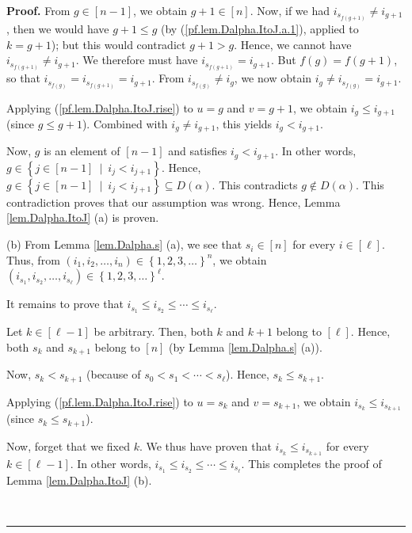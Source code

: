 \documentclass[numbers=enddot,12pt,final,onecolumn,notitlepage,abstracton]{scrartcl}
\theoremstyle{definition}
\newenvironment{proof}[1][Proof]{\noindent\textbf{#1.} }{\ \rule{0.5em}{0.5em}}
\newenvironment{verlong}{}{}
\begin{document}
\begin{verlong}
\begin{footnotesize}
\begin{proof}
From $g\in\left[  n-1\right]  $, we obtain $g+1\in\left[  n\right]  $. Now, if
we had $i_{s_{f\left(  g+1\right)  }}\neq i_{g+1}$, then we would have
$g+1\leq g$ (by (\ref{pf.lem.Dalpha.ItoJ.a.1}), applied to $k=g+1$); but this
would contradict $g+1>g$. Hence, we cannot have $i_{s_{f\left(  g+1\right)  }%
}\neq i_{g+1}$. We therefore must have $i_{s_{f\left(  g+1\right)  }}=i_{g+1}%
$. But $f\left(  g\right)  =f\left(  g+1\right)  $, so that $i_{s_{f\left(
g\right)  }}=i_{s_{f\left(  g+1\right)  }}=i_{g+1}$. From $i_{s_{f\left(
g\right)  }}\neq i_{g}$, we now obtain $i_{g}\neq i_{s_{f\left(  g\right)  }%
}=i_{g+1}$.

Applying (\ref{pf.lem.Dalpha.ItoJ.rise}) to $u=g$ and $v=g+1$, we obtain
$i_{g}\leq i_{g+1}$ (since $g\leq g+1$). Combined with $i_{g}\neq i_{g+1}$,
this yields $i_{g}<i_{g+1}$.

Now, $g$ is an element of $\left[  n-1\right]  $ and satisfies $i_{g}<i_{g+1}%
$. In other words, $g\in\left\{  j\in\left[  n-1\right]  \ \mid\ i_{j}%
<i_{j+1}\right\}  $. Hence, $g \in
\left\{  j\in\left[  n-1\right]  \ \mid\ i_{j}<i_{j+1}\right\}  \subseteq
D\left(  \alpha\right)  $. This contradicts $g\notin D\left(  \alpha\right)  $.
This contradiction proves that our assumption was wrong. Hence, Lemma
\ref{lem.Dalpha.ItoJ} (a) is proven.

(b) From Lemma \ref{lem.Dalpha.s} (a), we see that $s_{i}\in\left[  n\right]
$ for every $i\in\left[  \ell\right]  $. Thus, from $\left(  i_{1}%
,i_{2},\ldots,i_{n}\right)  \in\left\{  1,2,3,\ldots\right\}  ^{n}$, we obtain
$\left(  i_{s_{1}},i_{s_{2}},\ldots,i_{s_{\ell}}\right)  \in\left\{
1,2,3,\ldots\right\}  ^{\ell}$.

It remains to prove that $i_{s_{1}}\leq i_{s_{2}}\leq\cdots\leq i_{s_{\ell}}$.

Let $k\in\left[  \ell-1\right]  $ be arbitrary. Then, both $k$ and $k+1$
belong to $\left[  \ell\right]  $. Hence, both $s_{k}$ and $s_{k+1}$ belong to
$\left[  n\right]  $ (by Lemma \ref{lem.Dalpha.s} (a)).

Now, $s_{k}<s_{k+1}$ (because of $s_{0}<s_{1}<\cdots<s_{\ell}$). Hence,
$s_{k}\leq s_{k+1}$.

Applying (\ref{pf.lem.Dalpha.ItoJ.rise}) to $u=s_{k}$ and $v=s_{k+1}$, we
obtain $i_{s_{k}}\leq i_{s_{k+1}}$ (since $s_{k}\leq s_{k+1}$).

Now, forget that we fixed $k$. We thus have proven that $i_{s_{k}}\leq
i_{s_{k+1}}$ for every $k\in\left[  \ell-1\right]  $. In other words,
$i_{s_{1}}\leq i_{s_{2}}\leq\cdots\leq i_{s_{\ell}}$. This completes the proof
of Lemma \ref{lem.Dalpha.ItoJ} (b).


\end{proof}
\end{footnotesize}
\end{verlong}
\end{document}
